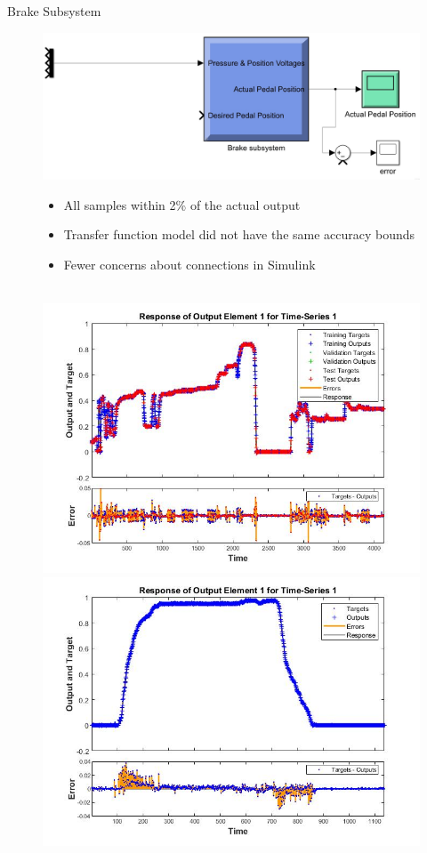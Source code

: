 \documentclass{beamer}
\begin{document}
\begin{frame}{Brake Subsystem}
  \begin{block}{}
\begin{figure}[H]
  			\centering \includegraphics[width=.48\linewidth , height=.37\textheight]{figs/img/brakeSimulinkBlock.jpg}\quad%
			\centering \begin{minipage}[b][0.4\textheight][c]{.45\linewidth}  \begin{itemize}
			\item All samples within 2\% of the actual output
			\item Transfer function model did not have the same accuracy bounds
			\item Fewer concerns about connections in Simulink
			\end{itemize} \end{minipage}\\[1em]
			\centering \includegraphics[width=.45\linewidth , height=.37\textheight]{figs/img/brake_new_neuralNetworkFig.jpg}\quad%
			\centering \includegraphics[width=.45\linewidth , height=.37\textheight]{figs/img/brake_new_neuralNetworkFigLog2Test.jpg}
  		\end{figure}
	
  \end{block}

\end{frame}
\end{document}
